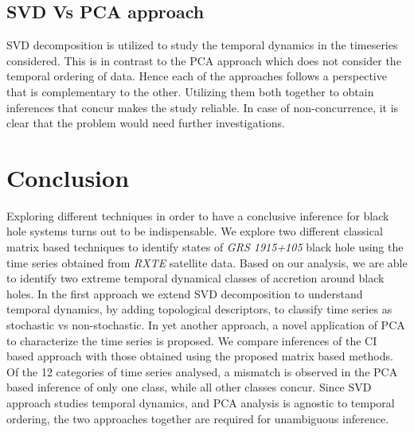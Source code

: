 \documentclass[journal]{IEEEtran}
\begin{document}
\subsection {SVD Vs PCA approach} SVD decomposition is utilized to study the temporal dynamics in the timeseries considered. This is in contrast to the PCA approach which does not consider the temporal ordering of data. Hence each of the approaches follows a perspective that is complementary to the other. Utilizing them both together to obtain inferences that concur makes the study reliable. In case of non-concurrence, it is clear that the problem would need further investigations.

	
	
	\section{Conclusion}
	Exploring different techniques in order to have a conclusive inference for black hole systems turns out to be indispensable. We explore two different classical matrix based techniques to identify states of \textit{GRS 1915+105} black hole using the time series obtained from \textit{RXTE} satellite data. Based on our analysis, we are able to identify two extreme temporal dynamical classes of accretion around black holes. In the first approach we extend  SVD decomposition to understand temporal dynamics,  by adding  topological descriptors, to classify time series as stochastic vs non-stochastic. In yet another approach, a novel application of  PCA  to characterize the time series is proposed. We compare inferences of the CI based approach with those obtained using the proposed matrix based methods. Of the 12 categories of time series analysed, a mismatch is observed in the PCA based inference of only one class, while all other classes concur. Since SVD approach studies temporal dynamics, and PCA analysis is agnostic to temporal ordering, the two approaches together are required for unambiguous inference.
	
\end{document}
